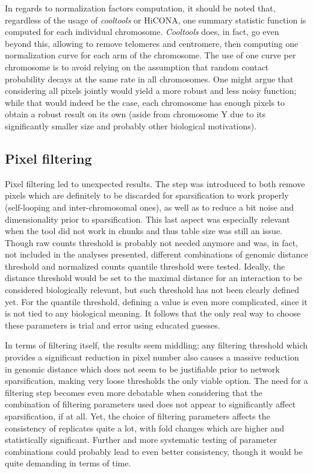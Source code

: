 In regards to normalization factors computation, it should be noted that, regardless of the usage of \textit{cooltools} or HiCONA, one summary statistic function is computed for each individual chromosome. \textit{Cooltools} does, in fact, go even beyond this, allowing to remove telomeres and centromere, then computing one normalization curve for each arm of the chromosome. The use of one curve per chromosome is to avoid relying on the assumption that random contact probability decays at the same rate in all chromosomes. One might argue that considering all pixels jointly would yield a more robust and less noisy function; while that would indeed be the case, each chromosome has enough pixels to obtain a robust result on its own (aside from chromosome Y due to its significantly smaller size and probably other biological motivations).

\subsection{Pixel filtering}
Pixel filtering led to unexpected results. The step was introduced to both remove pixels which are definitely to be discarded for sparsification to work properly (self-looping and inter-chromosomal ones), as well as to reduce a bit noise and dimensionality prior to sparsification. This last aspect was especially relevant when the tool did not work in chunks and thus table size was still an issue. Though raw counts threshold is probably not needed anymore and was, in fact, not included in the analyses presented, different combinations of genomic distance threshold and normalized counts quantile threshold were tested. Ideally, the distance threshold would be set to the maximal distance for an interaction to be considered biologically relevant, but such threshold has not been clearly defined yet. For the quantile threshold, defining a value is even more complicated, since it is not tied to any biological meaning. It follows that the only real way to choose these parameters is trial and error using educated guesses. 

In terms of filtering itself, the results seem middling; any filtering threshold which provides a significant reduction in pixel number also causes a massive reduction in genomic distance which does not seem to be justifiable prior to network sparsification, making very loose thresholds the only viable option. The need for a filtering step becomes even more debatable when considering that the combination of filtering parameters used does not appear to significantly affect sparsification, if at all. Yet, the choice of filtering parameters affects the consistency of replicates quite a lot, with fold changes which are higher and statistically significant. Further and more systematic testing of parameter combinations could probably lead to even better consistency, though it would be quite demanding in terms of time.

